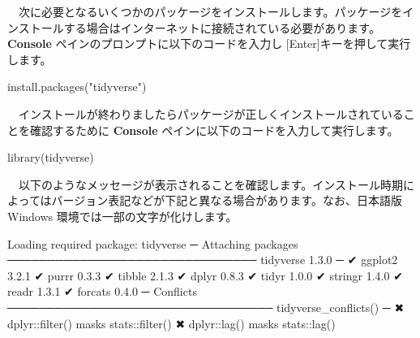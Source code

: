 \documentclass[
  12pt,
]{book}
\newenvironment{Shaded}{\begin{snugshade}}{\end{snugshade}}
\newcommand{\DecValTok}[1]{\textcolor[rgb]{0.00,0.00,0.81}{#1}}
\newcommand{\FloatTok}[1]{\textcolor[rgb]{0.00,0.00,0.81}{#1}}
\newcommand{\FunctionTok}[1]{\textcolor[rgb]{0.00,0.00,0.00}{#1}}
\newcommand{\NormalTok}[1]{#1}
\newcommand{\SpecialCharTok}[1]{\textcolor[rgb]{0.00,0.00,0.00}{#1}}
\newcommand{\StringTok}[1]{\textcolor[rgb]{0.31,0.60,0.02}{#1}}
\begin{document}
　次に必要となるいくつかのパッケージをインストールします。パッケージをインストールする場合はインターネットに接続されている必要があります。 \textbf{Console} ペインのプロンプトに以下のコードを入力し {[}Enter{]}キーを押して実行します。

\begin{Shaded}
\begin{Highlighting}[]
\FunctionTok{install.packages}\NormalTok{(}\StringTok{"tidyverse"}\NormalTok{)}
\end{Highlighting}
\end{Shaded}

　インストールが終わりましたらパッケージが正しくインストールされていることを確認するために \textbf{Console} ペインに以下のコードを入力して実行します。

\begin{Shaded}
\begin{Highlighting}[]
\FunctionTok{library}\NormalTok{(tidyverse)}
\end{Highlighting}
\end{Shaded}

　以下のようなメッセージが表示されることを確認します。インストール時期によってはバージョン表記などが下記と異なる場合があります。なお、日本語版 Windows 環境では一部の文字が化けします。

\begin{Shaded}
\begin{Highlighting}[]
\NormalTok{Loading required package}\SpecialCharTok{:}\NormalTok{ tidyverse}
\NormalTok{─ Attaching packages ─────────────────────────────── tidyverse }\DecValTok{1}\NormalTok{.}\FloatTok{3.0}\NormalTok{ ─}
\NormalTok{✔ ggplot2 }\DecValTok{3}\NormalTok{.}\FloatTok{2.1}\NormalTok{     ✔ purrr   }\DecValTok{0}\NormalTok{.}\FloatTok{3.3}
\NormalTok{✔ tibble  }\DecValTok{2}\NormalTok{.}\FloatTok{1.3}\NormalTok{     ✔ dplyr   }\DecValTok{0}\NormalTok{.}\FloatTok{8.3}
\NormalTok{✔ tidyr   }\DecValTok{1}\NormalTok{.}\FloatTok{0.0}\NormalTok{     ✔ stringr }\DecValTok{1}\NormalTok{.}\FloatTok{4.0}
\NormalTok{✔ readr   }\DecValTok{1}\NormalTok{.}\FloatTok{3.1}\NormalTok{     ✔ forcats }\DecValTok{0}\NormalTok{.}\FloatTok{4.0}
\NormalTok{─ Conflicts ───────────────────────────────── }\FunctionTok{tidyverse\_conflicts}\NormalTok{() ─}
\NormalTok{✖ dplyr}\SpecialCharTok{::}\FunctionTok{filter}\NormalTok{() masks stats}\SpecialCharTok{::}\FunctionTok{filter}\NormalTok{()}
\NormalTok{✖ dplyr}\SpecialCharTok{::}\FunctionTok{lag}\NormalTok{()    masks stats}\SpecialCharTok{::}\FunctionTok{lag}\NormalTok{()}
\end{Highlighting}
\end{Shaded}
\end{document}
